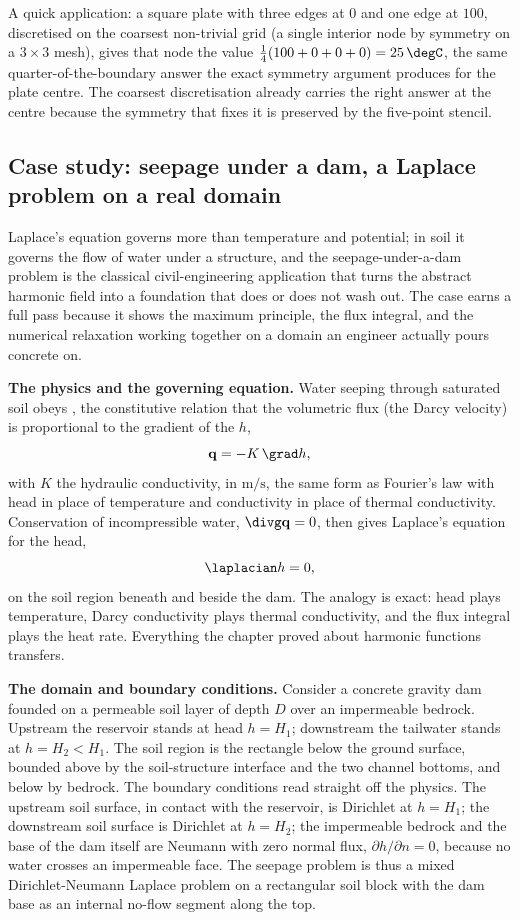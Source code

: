A quick application: a square plate with three edges at $0$ and one
edge at $100$, discretised on the coarsest non-trivial grid (a
single interior node by symmetry on a $3 \times 3$ mesh), gives that
node the value $\tfrac{1}{4}(100 + 0 + 0 + 0) = 25\,\degC$, the same
quarter-of-the-boundary answer the exact symmetry argument produces
for the plate centre. The coarsest discretisation already carries
the right answer at the centre because the symmetry that fixes it is
preserved by the five-point stencil.

\subsection{Case study: seepage under a dam, a Laplace problem on a real domain}

Laplace's equation governs more than temperature and potential; in
soil it governs the flow of water under a structure, and the
seepage-under-a-dam problem is the classical civil-engineering
application that turns the abstract harmonic field into a foundation
that does or does not wash out. The case earns a full pass because
it shows the maximum principle, the flux integral, and the numerical
relaxation working together on a domain an engineer actually pours
concrete on.

\textbf{The physics and the governing equation.} Water seeping
through saturated soil obeys , the
constitutive relation that the volumetric flux (the Darcy velocity)
is proportional to the gradient of the  $h$,
\[
\mathbf{q} = -K\,\grad h,
\]
with $K$ the hydraulic conductivity, in $\si{\meter\per\second}$,
the same form as Fourier's law with head in place of temperature
and conductivity in place of thermal conductivity. Conservation of
incompressible water, $\divg\mathbf{q} = 0$, then gives Laplace's
equation for the head,
\[
\laplacian h = 0,
\]
on the soil region beneath and beside the dam. The analogy is exact:
head plays temperature, Darcy conductivity plays thermal
conductivity, and the flux integral plays the heat rate. Everything
the chapter proved about harmonic functions transfers.

\textbf{The domain and boundary conditions.} Consider a concrete
gravity dam founded on a permeable soil layer of depth $D$ over an
impermeable bedrock. Upstream the reservoir stands at head $h =
H_{1}$; downstream the tailwater stands at $h = H_{2} < H_{1}$. The
soil region is the rectangle below the ground surface, bounded above
by the soil-structure interface and the two channel bottoms, and
below by bedrock. The boundary conditions read straight off the
physics. The upstream soil surface, in contact with the reservoir,
is Dirichlet at $h = H_{1}$; the downstream soil surface is Dirichlet
at $h = H_{2}$; the impermeable bedrock and the base of the dam
itself are Neumann with zero normal flux, $\partial h/\partial n =
0$, because no water crosses an impermeable face. The seepage problem
is thus a mixed Dirichlet-Neumann Laplace problem on a rectangular
soil block with the dam base as an internal no-flow segment along
the top.

